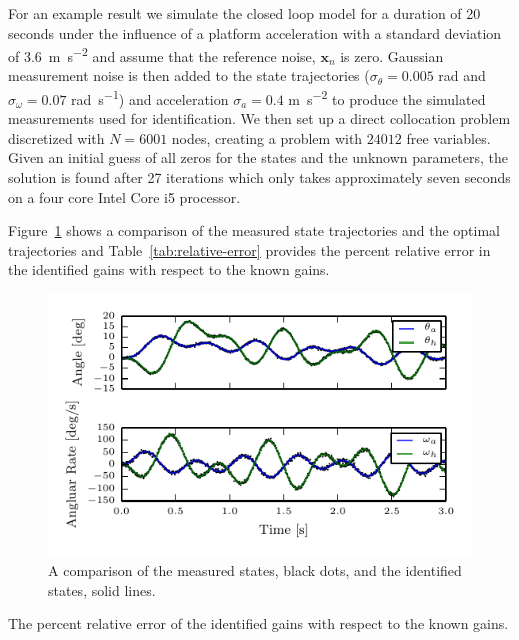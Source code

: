 \documentclass[11pt,a4paper,twocolumn]{article}
\begin{document}
For an example result we simulate the closed loop model for a duration of 20
seconds under the influence of a platform acceleration with a standard
deviation of 3.6~\si{\meter\per\second\squared} and assume that the reference
noise, $\mathbf{x}_n$ is zero. Gaussian measurement noise is then added
to the state trajectories ($\sigma_\theta=0.005$ \si{\radian} and
$\sigma_\omega=0.07$ \si{\radian\per\second}) and acceleration $\sigma_a=0.4$
\si{\meter\per\second\squared} to produce the simulated measurements used for
identification. We then set up a direct collocation problem discretized with
$N=6001$ nodes, creating a problem with $24012$ free variables. Given an
initial guess of all zeros for the states and the unknown parameters, the
solution is found after 27 iterations which only takes approximately seven
seconds on a four core Intel Core i5 processor.

Figure~\ref{fig:trajectory-comparison} shows a comparison of the measured state
trajectories and the optimal trajectories and Table~\ref{tab:relative-error}
provides the percent relative error in the identified gains with respect to the
known gains.
%
\begin{figure}
  \centering
  \includegraphics[width=\columnwidth]{figures/trajectory-comparison.pdf}
  \caption{A comparison of the measured states, black dots, and the identified
    states, solid lines.}
  \label{fig:trajectory-comparison}
\end{figure}
%
\begin{table}
  \centering
  \caption{The percent relative error of the identified gains with respect to
    the known gains.}
  
  \label{tab:relative-error}
\end{table}
\end{document}
